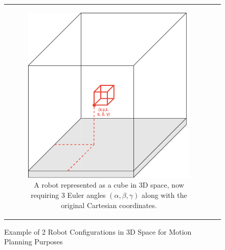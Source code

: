 \begin{figure}[H]
\begin{center}
\begin{tabular}{cc}
\begin{subfigure}{0.4\textwidth}
\begin{center}
    \includegraphics[width=\linewidth]{chapters/chapter2/img/motionPlanning/3DCubeConfiguration.png}
    \caption{A robot represented as a cube in 3D space, now requiring 3 Euler angles $(\alpha, \beta, \gamma)$ along with the original Cartesian coordinates.}
    \label{subfig:3DCubeConfig}
    \end{center}
    \end{subfigure} \\
\end{tabular}
    \caption{Example of 2 Robot Configurations in 3D Space for Motion Planning Purposes}
    \label{fig:configuration}

\end{center}
\end{figure}